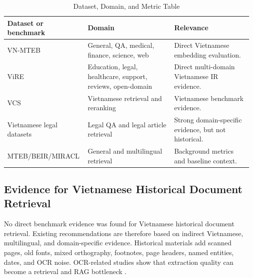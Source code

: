 \documentclass[11pt]{article}
\begin{document}
\begin{table}[H]
\centering
\caption{Dataset, Domain, and Metric Table}
\label{tab:datasets}
\small
\begin{tabularx}{\textwidth}{p{}p{}Y}
\toprule
Dataset or benchmark & Domain & Relevance \\
\midrule
VN-MTEB & General, QA, medical, finance, science, web & Direct Vietnamese embedding evaluation. \\
ViRE & Education, legal, healthcare, support, reviews, open-domain & Direct multi-domain Vietnamese IR evidence. \\
VCS & Vietnamese retrieval and reranking & Vietnamese benchmark evidence. \\
Vietnamese legal datasets & Legal QA and legal article retrieval & Strong domain-specific evidence, but not historical. \\
MTEB/BEIR/MIRACL & General and multilingual retrieval & Background metrics and baseline context. \\
\bottomrule
\end{tabularx}
\end{table}

\subsection{Evidence for Vietnamese Historical Document Retrieval}
No direct benchmark evidence was found for Vietnamese historical document retrieval. Existing recommendations are therefore based on indirect Vietnamese, multilingual, and domain-specific evidence. Historical materials add scanned pages, old fonts, mixed orthography, footnotes, page headers, named entities, dates, and OCR noise. OCR-related studies show that extraction quality can become a retrieval and RAG bottleneck \cite{zhang-etal-2024-ocr-hinders-rag,nguyen-thiet-2025-sinovietnamese-ocr}.
\end{document}
